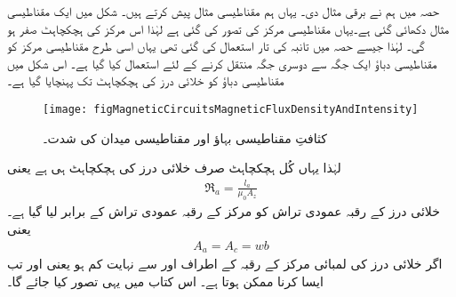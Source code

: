 حصہ  میں ہم نے برقی مثال دی۔ یہاں ہم مقناطیسی مثال پیش  کرتے ہیں۔ شکل  میں ایک مقناطیسی مثال دکھائی گئی ہے۔یہاں مقناطیسی مرکز کی  تصور کی گئی ہے لہٰذا اس مرکز کی ہچکچاہٹ  صفر ہو گی۔ لہٰذا جیسے حصہ  میں تانبہ کی تار استعمال کی گئی تھی یہاں اسی طرح مقناطیسی مرکز کو مقناطیسی دباؤ  ایک جگہ سے دوسری جگہ منتقل کرنے کے لئے استعمال کیا گیا ہے۔ اس شکل میں مقناطیسی دباؤ کو خلائی درز کی ہچکچاہٹ  تک پہنچایا گیا ہے۔
\begin{figure}
\centering
\texttt{[image: figMagneticCircuitsMagneticFluxDensityAndIntensity]}
\caption{کثافتِ مقناطیسی بہاؤ اور مقناطیسی میدان کی شدت۔}
\label{شکل_مقناطیسی__کثافت_مقناطیسی_بہاو_اور_شدت}
\end{figure}

لہٰذا یہاں کُل ہچکچاہٹ صرف خلائی درز کی ہچکچاہٹ ہی ہے یعنی
\begin{align}
\Re_a=\frac{l_a}{\mu_0 A_z}
\end{align}
خلائی درز کے رقبہ عمودی تراش  کو مرکز کے رقبہ عمودی تراش  کے برابر لیا گیا ہے۔ یعنی 
\begin{align}
A_a=A_c=w b
\end{align}
اگر خلائی درز کی لمبائی  مرکز کے رقبہ کے اطراف  اور  سے نہایت کم ہو یعنی  اور  تب ایسا کرنا ممکن ہوتا ہے۔ اس کتاب میں یہی تصور کیا جائے گا۔

